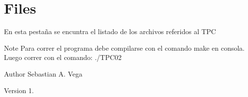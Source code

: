 \hypertarget{index_Files}{}\section{Files}\label{index_Files}

\begin{DoxyItemize}
\item En esta pestaña se encuntra el listado de los archivos referidos al T\+PC \begin{DoxyNote}{Note}
Para correr el programa debe compilarse con el comando make en consola. Luego correr con el comando\+: ./\+T\+P\+C02 
\end{DoxyNote}
\begin{DoxyAuthor}{Author}
Sebastian A. Vega 
\end{DoxyAuthor}
\begin{DoxyVersion}{Version}
1. 
\end{DoxyVersion}

\end{DoxyItemize}